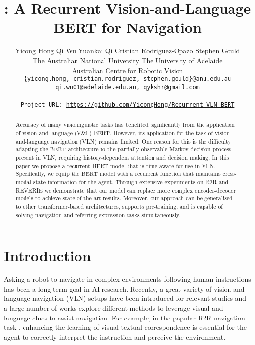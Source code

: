\documentclass[final]{cvpr}
\begin{document}
\title{\vlnbert: A Recurrent Vision-and-Language BERT for Navigation}

\author{
Yicong Hong \quad Qi Wu \quad Yuankai Qi \quad Cristian Rodriguez-Opazo \quad Stephen Gould\\
The Australian National University \quad The University of Adelaide\\
Australian Centre for Robotic Vision\\
{\tt\small \{yicong.hong, cristian.rodriguez, stephen.gould\}@anu.edu.au} \\
{\tt\small qi.wu01@adelaide.edu.au, qykshr@gmail.com} \\ \\
{\tt\small Project URL: \href{https://github.com/YicongHong/Recurrent-VLN-BERT}{https://github.com/YicongHong/Recurrent-VLN-BERT}}
}

\maketitle



\begin{abstract}
Accuracy of many visiolinguistic tasks has benefited significantly from the application of vision-and-language (V\&L) BERT. However, its application for the task of vision-and-language navigation (VLN) remains limited. One reason for this is the difficulty adapting the BERT architecture to the partially observable Markov decision process present in VLN, requiring history-dependent attention and decision making. In this paper we propose a recurrent BERT model that is time-aware for use in VLN. Specifically, we equip the BERT model with a recurrent function that maintains cross-modal state information for the agent. Through extensive experiments on R2R and REVERIE we demonstrate that our model can replace more complex encoder-decoder models to achieve state-of-the-art results. Moreover, our approach can be generalised to other transformer-based architectures, supports pre-training, and is capable of solving navigation and referring expression tasks simultaneously.
\end{abstract}



\section{Introduction}
\label{sec:introduction}

Asking a robot to navigate in complex environments following human instructions has been a long-term goal in AI research. Recently, a great variety of vision-and-language navigation (VLN) setups \cite{anderson2018vision, qi2020reverie, thomason2020vision} have been introduced for relevant studies and a large number of works explore different methods to leverage visual and language clues to assist navigation. For example, in the popular R2R navigation task \cite{anderson2018vision}, enhancing the learning of visual-textual correspondence is essential for the agent to correctly interpret the instruction and perceive the environment.
\end{document}
